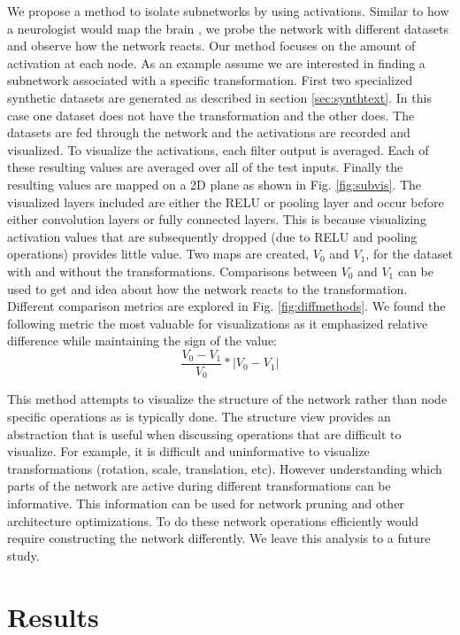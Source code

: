 \documentclass[10pt,twocolumn,letterpaper]{article}
\begin{document}
We propose a method to isolate subnetworks by using activations. Similar to how a neurologist would map the brain \cite{friston1998event}, we probe the network with different datasets and observe how the network reacts. Our method focuses on the amount of activation at each node. As an example assume we are interested in finding a subnetwork associated with a specific transformation. First two specialized synthetic datasets are generated as described in section \ref{sec:synthtext}. In this case one dataset does not have the transformation and the other does. The datasets are fed through the network and the activations are recorded and visualized. To visualize the activations, each filter output is averaged. Each of these resulting values are averaged over all of the test inputs. Finally the resulting values are mapped on a 2D plane as shown in Fig. \ref{fig:subvis}. The visualized layers included are either the RELU or pooling layer and occur before either convolution layers or fully connected layers. This is because visualizing activation values that are subsequently dropped (due to RELU and pooling operations) provides little value. Two maps are created, $V_0$ and $V_1$, for the dataset with and without the transformations. Comparisons between $V_0$ and $V_1$ can be used to get and idea about how the network reacts to the transformation. Different comparison metrics are explored in Fig. \ref{fig:diffmethods}. We found the following metric the most valuable for visualizations as it emphasized relative difference while maintaining the sign of the value:
\begin{equation} \label{eq:1}
\frac{V_0-V_1}{V_0} * |V_0-V_1|
\end{equation}


This method attempts to visualize the structure of the network rather than node specific operations as is typically done. The structure view provides an abstraction that is useful when discussing operations that are difficult to visualize. For example, it is difficult and uninformative to visualize transformations (rotation, scale, translation, etc). However understanding which parts of the network are active during different transformations can be informative. This information can be used for network pruning and other architecture optimizations. To do these network operations efficiently would require constructing the network differently. We leave this analysis to a future study.

\section{Results}
\end{document}
